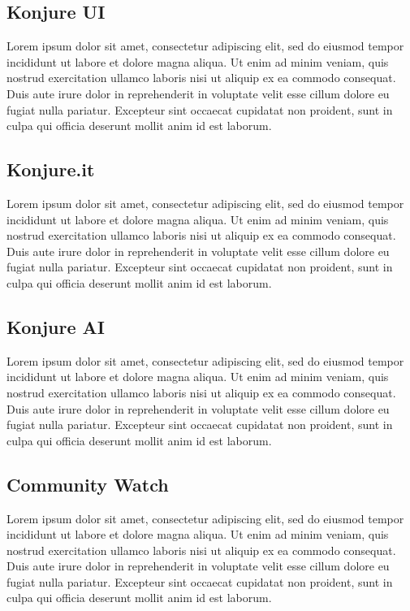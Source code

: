 \documentclass{article}
\newcommand\tab[1][1cm]{\hspace*{#1}}
\begin{document}
\subsection{Konjure UI}

\tab Lorem ipsum dolor sit amet, consectetur adipiscing elit, sed do eiusmod tempor incididunt ut labore et dolore magna aliqua. Ut enim ad minim veniam, quis nostrud exercitation ullamco laboris nisi ut aliquip ex ea commodo consequat. Duis aute irure dolor in reprehenderit in voluptate velit esse cillum dolore eu fugiat nulla pariatur. Excepteur sint occaecat cupidatat non proident, sunt in culpa qui officia deserunt mollit anim id est laborum.

\subsection{Konjure.it}

\tab Lorem ipsum dolor sit amet, consectetur adipiscing elit, sed do eiusmod tempor incididunt ut labore et dolore magna aliqua. Ut enim ad minim veniam, quis nostrud exercitation ullamco laboris nisi ut aliquip ex ea commodo consequat. Duis aute irure dolor in reprehenderit in voluptate velit esse cillum dolore eu fugiat nulla pariatur. Excepteur sint occaecat cupidatat non proident, sunt in culpa qui officia deserunt mollit anim id est laborum.

\subsection{Konjure AI}

\tab Lorem ipsum dolor sit amet, consectetur adipiscing elit, sed do eiusmod tempor incididunt ut labore et dolore magna aliqua. Ut enim ad minim veniam, quis nostrud exercitation ullamco laboris nisi ut aliquip ex ea commodo consequat. Duis aute irure dolor in reprehenderit in voluptate velit esse cillum dolore eu fugiat nulla pariatur. Excepteur sint occaecat cupidatat non proident, sunt in culpa qui officia deserunt mollit anim id est laborum.

\subsection{Community Watch}

\tab Lorem ipsum dolor sit amet, consectetur adipiscing elit, sed do eiusmod tempor incididunt ut labore et dolore magna aliqua. Ut enim ad minim veniam, quis nostrud exercitation ullamco laboris nisi ut aliquip ex ea commodo consequat. Duis aute irure dolor in reprehenderit in voluptate velit esse cillum dolore eu fugiat nulla pariatur. Excepteur sint occaecat cupidatat non proident, sunt in culpa qui officia deserunt mollit anim id est laborum.
\end{document}
